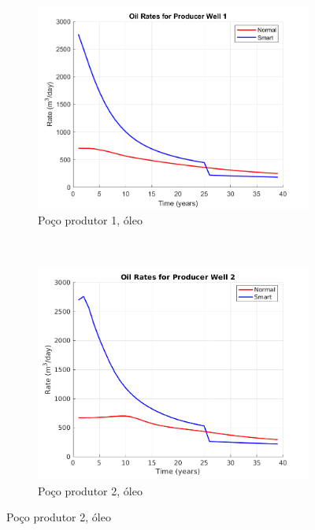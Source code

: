 \begin{figure}[!ht]
	\centering
	\begin{subfigure}[b]{.45\textwidth}
		\includegraphics[width=\textwidth]{figs/resultadosLSAIGUP/LSAIGUP_OilWell1_Zoom}
		\caption{Po\c{c}o produtor 1, \'{o}leo}
		\label{LSAIGUP_OilWell1}
	\end{subfigure}
	~
	\begin{subfigure}[b]{.45\textwidth}
		\includegraphics[width=\textwidth]{figs/resultadosLSAIGUP/LSAIGUP_OilWell2_Zoom}
		\caption{Po\c{c}o produtor 2, \'{o}leo}
		\label{LSAIGUP_OilWell2}
	\end{subfigure}
	

\end{figure}
